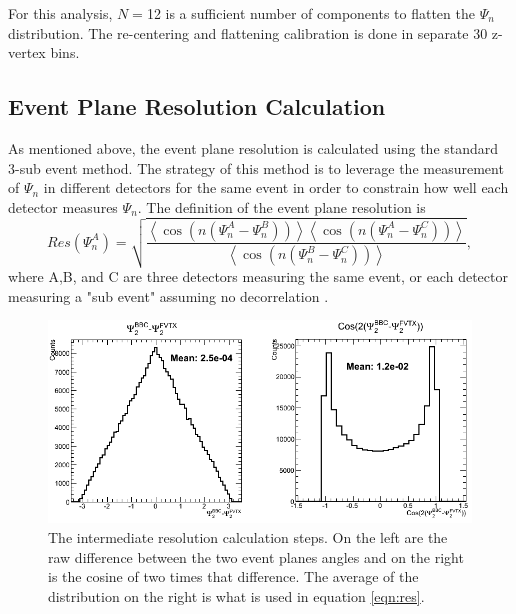 For this analysis, $N=$12 is a sufficient number of components to flatten the $\Psi_n$ distribution. The re-centering and flattening calibration is done in separate 30 z-vertex bins.

\subsection{Event Plane Resolution Calculation}
As mentioned above, the event plane resolution is calculated using the standard 3-sub event method. The strategy of this method is to leverage the measurement of $\Psi_n$ in
different detectors for the same event in order to constrain how well each detector measures $\Psi_n$. The definition of the event plane resolution is
\begin{equation}
Res(\Psi_n^A) = \sqrt{\frac{\left<\cos(n(\Psi_n^A - \Psi_n^B))\right>\left<\cos(n(\Psi_n^A - \Psi_n^C))\right>}{\left<\cos(n(\Psi_n^B - \Psi_n^C))\right>}},
\label{eqn:res}
\end{equation}
where A,B, and C are three detectors measuring the same event, or each detector measuring a "sub event" assuming no decorrelation \cite{PhysRevC.58.1671}.

\begin{figure}[!h]
\begin{center}
\includegraphics[width=0.85\linewidth]{figs/resolution_intermediate_calc.png}
\caption{The intermediate resolution calculation steps. On the left are the raw difference between the two event planes angles and on the right is the cosine of two times that difference. The average of the distribution on the right is what is used in equation \ref{eqn:res}.}
\label{fig:fvtx_ew_default}
\end{center}
\end{figure}

